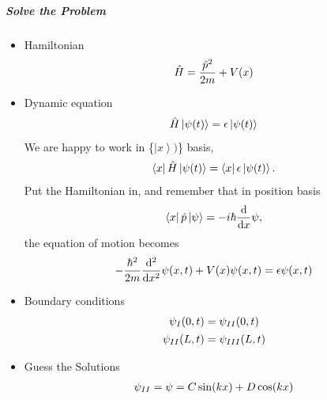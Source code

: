 \documentclass[letterpaper,10pt,english]{sphinxmanual}
\def\d{{\rm d}}
\newcommand{\bra}[1]{\left\langle #1\right|}
\newcommand{\ket}[1]{\left| #1\right\rangle}
\begin{document}
\subparagraph{Solve the Problem}
\label{Quantum/QuantumMechanics:solve-the-problem}\begin{itemize}
\item {} 
Hamiltonian
\begin{gather}
\begin{split}\hat H = \frac{\hat p ^2}{2 m } + V(x)\end{split}\notag
\end{gather}
\item {} 
Dynamic equation
\begin{gather}
\begin{split}\hat H \ket{\psi(t)} = \epsilon \ket{\psi(t)}\end{split}\notag
\end{gather}
We are happy to work in \{\(\ket{x})\)\} basis,
\begin{gather}
\begin{split}\bra{x} \hat H \ket{\psi(t)} = \bra{x} \epsilon \ket{\psi(t)} .\end{split}\notag
\end{gather}
Put the Hamiltonian in, and remember that in position basis
\begin{gather}
\begin{split}\bra{x} \hat p \ket{\psi} = - i \hbar\frac{\d}{\d x} \psi ,\end{split}\notag
\end{gather}
the equation of motion becomes
\begin{gather}
\begin{split}- \frac{\hbar ^2}{2 m} \frac{\d^2}{\d x^2} \psi(x,t) + V(x) \psi(x,t) = \epsilon \psi(x,t)\end{split}\notag
\end{gather}
\item {} 
Boundary conditions
\begin{gather}
\begin{split}\psi _ I(0,t) = \psi _ {II}(0,t)\end{split}\notag\\\begin{split}\psi _ {II}(L, t) = \psi _ {III}(L, t)\end{split}\notag
\end{gather}
\item {} 
Guess the Solutions
\begin{gather}
\begin{split}\psi_{II} = \psi = C \sin (k x) + D \cos(kx)\end{split}\notag
\end{gather}

\end{itemize}
\end{document}
